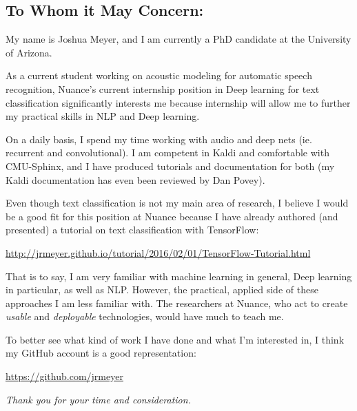 \documentclass[12pt,a4paper]{article}
\begin{document}
\subsection*{To Whom it May Concern:}

My name is Joshua Meyer, and I am currently a PhD candidate at the University of Arizona.

As a current student working on acoustic modeling for automatic speech recognition, Nuance's current internship position in Deep learning for text classification significantly interests me because internship will allow me to further my practical skills in NLP and Deep learning.

On a daily basis, I spend my time working with audio and deep nets (ie. recurrent and convolutional). I am competent in Kaldi and comfortable with CMU-Sphinx, and I have produced tutorials and documentation for both (my Kaldi documentation has even been reviewed by Dan Povey).

Even though text classification is not my main area of research, I believe I would be a good fit for this position at Nuance because I have already authored (and presented) a tutorial on text classification with TensorFlow:

\begin{center}
\href{<http://jrmeyer.github.io/tutorial/2016/02/01/TensorFlow-Tutorial.html>}{http://jrmeyer.github.io/tutorial/2016/02/01/TensorFlow-Tutorial.html} \\
\end{center}

That is to say, I am very familiar with machine learning in general, Deep learning in particular, as well as NLP. However, the practical, applied side of these approaches I am less familiar with. The researchers at Nuance, who act to create \textit{usable} and \textit{deployable} technologies, would have much to teach me.

To better see what kind of work I have done and what I'm interested in, I think my GitHub account is a good representation:

\begin{center}
\href{<https://github.com/jrmeyer>}{https://github.com/jrmeyer}\\
\end{center}

\vspace{2cm}






\begin{center}
\textit{Thank you for your time and consideration.}  
\end{center}
\end{document}
